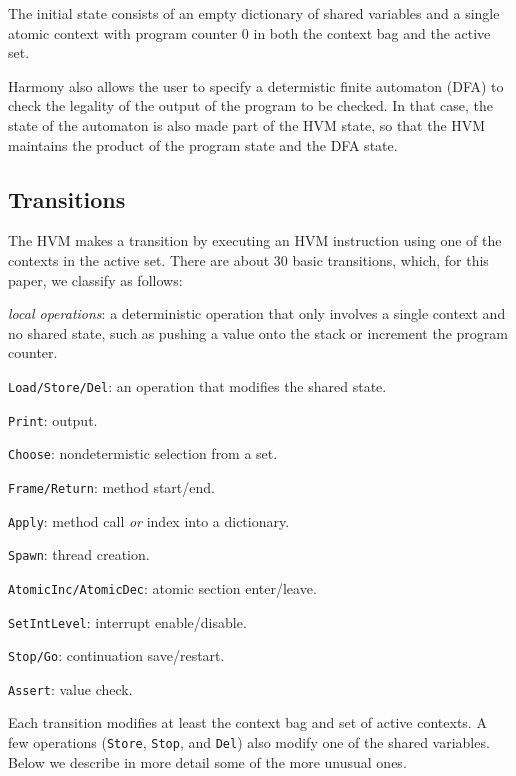 \documentclass[twocolumn]{article}
\begin{document}
The initial state consists of an empty dictionary of shared variables and
a single atomic context with program
counter 0 in both the context bag and the active set.

Harmony also allows the user to specify a determistic finite automaton
(DFA) to check the legality of the output of the program to be
checked.  In that case, the state of the automaton is also made
part of the HVM state, so that the HVM maintains the product of the
program state and the DFA state.

\subsection{Transitions}

The HVM makes a transition by executing an HVM instruction using
one of the contexts in the active set.  There are about 30 basic
transitions, which, for this paper, we classify as follows:

\begin{compactitem}
\item \emph{local operations}: a deterministic operation that only
involves a single context and no shared state, such as pushing a value
onto the stack or increment the program counter.
\item \texttt{Load/Store/Del}: an operation that modifies the shared state.
\item \texttt{Print}: output.
\item \texttt{Choose}: nondetermistic selection from a set.
\item \texttt{Frame/Return}: method start/end.
\item \texttt{Apply}: method call \emph{or} index into a dictionary.
\item \texttt{Spawn}: thread creation.
\item \texttt{AtomicInc/AtomicDec}: atomic section enter/leave.
\item \texttt{SetIntLevel}: interrupt enable/disable.
\item \texttt{Stop/Go}: continuation save/restart.
\item \texttt{Assert}: value check.
\end{compactitem}

Each transition modifies at least the context bag and set of active
contexts.
A few operations (\texttt{Store}, \texttt{Stop}, and \texttt{Del})
also modify one of the shared variables.
Below we describe in more detail some of the more unusual ones.
\end{document}
